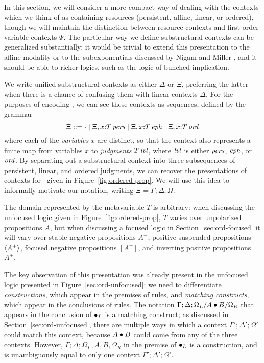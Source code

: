 In this section, we will consider a more compact way of dealing with
the contexts which we think of as containing resources (persistent,
affine, linear, or ordered), though we will maintain the distinction
between resource contexts and first-order variable 
contexts $\Psi$.  The particular way we define substructural contexts
can be generalized substantially: it would be trivial to extend
this presentation to the affine modality or to the subexponentials
discussed by Nigam and Miller \cite{nigam09algorithmic}, and it should
be able to richer logics, such as the logic of bunched implication.

We write unified substructural contexts as either $\Delta$ or $\Xi$,
preferring the latter when there is a chance of confusing them with
linear contexts $\Delta$. For the purposes of encoding \ollll, we can
see these contexts as sequences, defined by the grammar
\[
\Xi ::= \cdot 
  \mid \Xi, x{:}{T}\,{{\it pers}}
  \mid \Xi, x{:}{T}\,{{\it eph}}
  \mid \Xi, x{:}{T}\,{{\it ord}}
\]
where each of the {\em variables} $x$ are distinct, so that the
context also represents a finite map from variables $x$ to {\it
  judgments} ${T}\,{{\it lvl}}$, where ${\it lvl}$ is either ${\it pers}$, ${\it eph}$,
or ${\it ord}$.  By separating out a substructural context into three
subsequences of persistent, linear, and ordered judgments, we can
recover the presentations of contexts for \ollll~given in
Figure~\ref{fig:ordered-prop}. We will use this idea to informally
motivate our notation, writing $\Xi = \Gamma; \Delta; \Omega$.

The domain represented by the metavariable $T$ is arbitrary: when
discussing the unfocused logic given in Figure~\ref{fig:ordered-prop},
$T$ varies over unpolarized propositions $A$, but when discussing a
focused logic in Section~\ref{sec:ord-focused} it will vary over
stable negative propositions $A^-$, positive suspended propositions
$\langle {A^+} \rangle$, focused negative propositions $[A^-]$, and inverting
positive propositions $A^+$.




The key observation of this presentation was already present in the
unfocused logic presented in Figure~\ref{sec:ord-unfocused}: we need
to differentiate {\it constructions}, which appear in the premises of
rules, and {\it matching constructs}, which appear in the conclusions
of rules.  The notation $\Gamma; \Delta; \Omega_L/A\mathbin{\bullet} B/\Omega_R$
that appears in the conclusion of ${\mathbin{\bullet}}_L$ is a matching construct;
as discussed in Section~\ref{sec:ord-unfocused}, there are multiple
ways in which a context $\Gamma'; \Delta'; \Omega'$ could match this
context, because $A \mathbin{\bullet} B$ could come from any of the three
contexts. However, $\Gamma; \Delta; \Omega_L,{A},{B},
\Omega_R$ in the premise of ${\mathbin{\bullet}}_L$ is a construction, and is
unambiguously equal to only one context $\Gamma'; \Delta'; \Omega'$.

